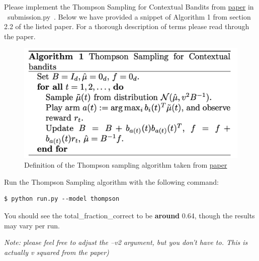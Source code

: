 \item {}

Please implement the Thompson Sampling for Contextual Bandits from  \href{http://proceedings.mlr.press/v28/agrawal13.pdf}{paper} in ~submission.py~. Below we have provided a snippet of Algorithm 1 from section 2.2 of the listed paper. For a thorough description of terms please read through the paper.

\begin{figure}[H]
\centering
  \includegraphics[width=.5\linewidth]{images/thompson_sampling_algorithm.png}
  \caption{Definition of the Thompson sampling algorithm taken from \href{http://proceedings.mlr.press/v28/agrawal13.pdf}{paper}}
\end{figure}

Run the Thompson Sampling algorithm with the following command:

\begin{lstlisting}
$ python run.py --model thompson
\end{lstlisting}

You should see the total\_fraction\_correct to be \textbf{around} 0.64, though the results may vary per run.

\textit{Note: please feel free to adjust the --v2 argument, but you don't have to. This is actually v squared from the paper) }